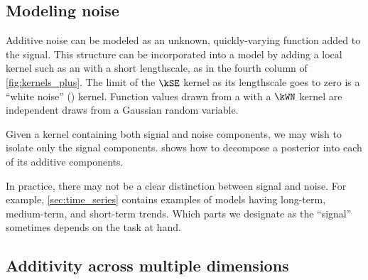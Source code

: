 \subsection{Modeling noise}


Additive noise can be modeled as an unknown, quickly-varying function added to the signal.
This structure can be incorporated into a \gp{} model by adding a local kernel such as an \kSE{} with a short lengthscale, as in the fourth column of \cref{fig:kernels_plus}.
The limit of the $\kSE$ kernel as its lengthscale goes to zero is a ``white noise'' (\kWN) kernel.
Function values drawn from a \gp{} with a $\kWN$ kernel are independent draws from a Gaussian random variable.

Given a kernel containing both signal and noise components, we may wish to isolate only the signal components.
 shows how to decompose a \gp{} posterior into each of its additive components.

In practice, there may not be a clear distinction between signal and noise.
For example, \cref{sec:time_series} contains examples of models having long-term, medium-term, and short-term trends.
Which parts we designate as the ``signal'' sometimes depends on the task at hand.


\subsection{Additivity across multiple dimensions}
\label{sec:additivity-multiple-dimensions}

